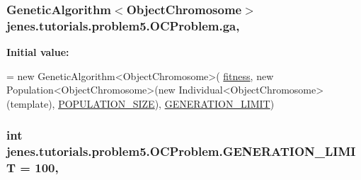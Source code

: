 \hypertarget{classjenes_1_1tutorials_1_1problem5_1_1_o_c_problem_ad2413f0f7718203ea23a643ca7dd8769}{
\subsubsection[{ga}]{\setlength{\rightskip}{0pt plus 5cm}Genetic\-Algorithm$<${\bf Object\-Chromosome}$>$ jenes.\-tutorials.\-problem5.\-O\-C\-Problem.\-ga\hspace{0.3cm}{\ttfamily [static]}, {\ttfamily [private]}}}\label{classjenes_1_1tutorials_1_1problem5_1_1_o_c_problem_ad2413f0f7718203ea23a643ca7dd8769}
{\bfseries Initial value\-:}
\begin{DoxyCode}
=
            \textcolor{keyword}{new} GeneticAlgorithm<ObjectChromosome>( \hyperlink{classjenes_1_1tutorials_1_1problem5_1_1_o_c_problem_a568ec7d71c8cdcca7cb01674dac7fd62}{fitness}, \textcolor{keyword}{new} Population<ObjectChromosome>(\textcolor{keyword}{new} 
      Individual<ObjectChromosome>(\textcolor{keyword}{template}), \hyperlink{classjenes_1_1tutorials_1_1problem5_1_1_o_c_problem_a6f83b4fb8527ded39ad6dd116e7677e7}{POPULATION\_SIZE}), 
      \hyperlink{classjenes_1_1tutorials_1_1problem5_1_1_o_c_problem_a5ca815ddd4d090d3bfc74d0a1d3dfeab}{GENERATION\_LIMIT})
\end{DoxyCode}
\hypertarget{classjenes_1_1tutorials_1_1problem5_1_1_o_c_problem_a5ca815ddd4d090d3bfc74d0a1d3dfeab}{
\subsubsection[{G\-E\-N\-E\-R\-A\-T\-I\-O\-N\-\_\-\-L\-I\-M\-I\-T}]{\setlength{\rightskip}{0pt plus 5cm}int jenes.\-tutorials.\-problem5.\-O\-C\-Problem.\-G\-E\-N\-E\-R\-A\-T\-I\-O\-N\-\_\-\-L\-I\-M\-I\-T = 100\hspace{0.3cm}{\ttfamily [static]}, {\ttfamily [private]}}}\label{classjenes_1_1tutorials_1_1problem5_1_1_o_c_problem_a5ca815ddd4d090d3bfc74d0a1d3dfeab}

